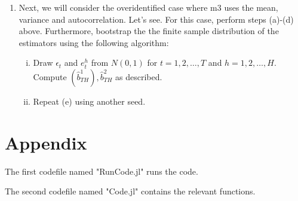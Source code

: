 \documentclass{article} %
\theoremstyle{definition}
\newenvironment{solution}[1][Answer]{\begin{singlespace}\underline{\textbf{#1:}}\quad }{\ \rule{0.3em}{0.3em}\end{singlespace}} %
\begin{document}
\begin{enumerate}
\begin{solution}
\begin{enumerate}[label=(\alph*)]
\begin{equation*}
\begin{bmatrix}
											\end{bmatrix}
				\end{equation*}
				The variance-covariance matrix of $\hat{b}^{2}_{TH}$ is given by
				\begin{equation*}
											\begin{bmatrix}
											7.43e-5 & -1.02e-3 \\
											-1.02e-3 & 0.01
											\end{bmatrix}
				\end{equation*}
				The standard errors are given by
				\begin{equation*}
											\begin{bmatrix}
											0.01 \\
											0.12
											\end{bmatrix}
				\end{equation*}
				For local identification, it is useful to have the elements of $\nabla_{b} g_{T}(\hat{b}^{2}_{TH})$ to be relatively large. This is because if the distance between the modeled moments and the data moments is changing rapidly around the optimal parameter choices, we can be more confident in the precision with which we've identified the local optimal parameter values.
		\end{enumerate}
		\end{solution}
		
		\item Next, we will consider the overidentified case where m3 uses the mean, variance and autocorrelation. Let’s see. For this case, perform steps (a)-(d) above. Furthermore, bootstrap the the finite sample distribution of the estimators using the following algorithm:
		\begin{enumerate}[i.]
			\item Draw $ \epsilon_t $ and $ e_t^h $ from $ N(0,1) $ for $ t = 1,2,\hdots,T $ and $ h = 1,2,\hdots,H $. Compute $ (\hat{b}_{TH}^1), \hat{b}_{TH}^2 $ as described.
			
			\item Repeat (e) using another seed.
		\end{enumerate}
	
	\end{enumerate}

	\section*{Appendix}
 	The first codefile named "RunCode.jl" runs the code.
	
 	The second codefile named "Code.jl" contains the relevant functions.
\end{document}
